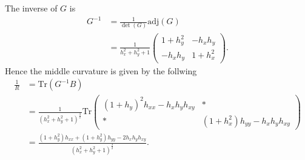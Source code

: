 The inverse of $G$ is
\begin{align}
    G^{-1}
    &= \frac{1}{\det(G)} \text{adj}(G)\\
    &= \frac{1}{h_x^2+h_y^2 +1} \begin{pmatrix}1+h_y^2 & -h_xh_y \\-h_xh_y  &
    1+h_x^2\end{pmatrix} .
\end{align}
Hence the middle curvature is given by the follwing
\begin{align}
    \frac{1}{R} &
    = \text{Tr}(G^{-1}B)\\
                &= \frac{1}{(h_x^2 + h_y^2+1)^{\frac{3}{2}}}
    \text{Tr}\begin{pmatrix} (1+h_y)^2 h_{x x} - h_x h_y h_{xy} & *\\
    * & (1+h_x^2)h_{yy}-h_xh_yh_{xy}\end{pmatrix}\\
    &=\frac{(1+h_y^2)h_{x x}+(1+h_y^2)h_{yy} -
    2h_xh_yh_{xy}}{\left( h_x^2+h_y^2+1 \right)^{\frac{3}{2}} }.
\end{align}

